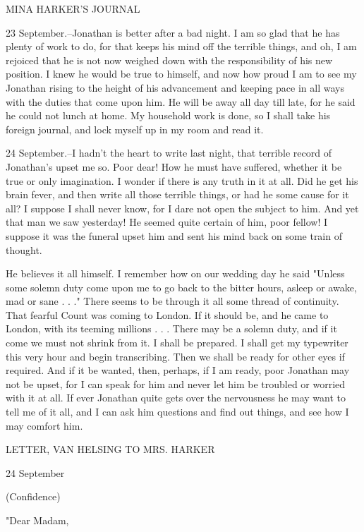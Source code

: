 MINA HARKER'S JOURNAL 

23 September.--Jonathan is better after a bad night. I am so glad that he has plenty of work to do, for that keeps his mind off the terrible things, and oh, I am rejoiced that he is not now weighed down with the responsibility of his new position. I knew he would be true to himself, and now how proud I am to see my Jonathan rising to the height of his advancement and keeping pace in all ways with the duties that come upon him. He will be away all day till late, for he said he could not lunch at home. My household work is done, so I shall take his foreign journal, and lock myself up in my room and read it. 

24 September.--I hadn't the heart to write last night, that terrible record of Jonathan's upset me so. Poor dear! How he must have suffered, whether it be true or only imagination. I wonder if there is any truth in it at all. Did he get his brain fever, and then write all those terrible things, or had he some cause for it all? I suppose I shall never know, for I dare not open the subject to him. And yet that man we saw yesterday! He seemed quite certain of him, poor fellow! I suppose it was the funeral upset him and sent his mind back on some train of thought. 

He believes it all himself. I remember how on our wedding day he said "Unless some solemn duty come upon me to go back to the bitter hours, asleep or awake, mad or sane . . ." There seems to be through it all some thread of continuity. That fearful Count was coming to London. If it should be, and he came to London, with its teeming millions . . . There may be a solemn duty, and if it come we must not shrink from it. I shall be prepared. I shall get my typewriter this very hour and begin transcribing. Then we shall be ready for other eyes if required. And if it be wanted, then, perhaps, if I am ready, poor Jonathan may not be upset, for I can speak for him and never let him be troubled or worried with it at all. If ever Jonathan quite gets over the nervousness he may want to tell me of it all, and I can ask him questions and find out things, and see how I may comfort him. 

LETTER, VAN HELSING TO MRS. HARKER 

24 September 

(Confidence) 

"Dear Madam, 

